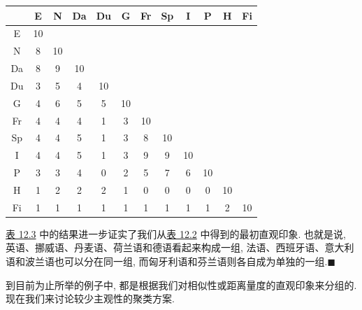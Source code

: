 \begin{mvtable}
\label{tab:12.3}
\footnotesize
\begin{tabular}{cccccccccccc}
\toprule
 & E & N & Da & Du & G & Fr & Sp & I & P & H & Fi\\
\midrule
E & 10 & & & & & & & & & &\\
N & 8 & 10 & & & & & & & & &\\
Da & 8 & 9 & 10 & & & & & & & &\\
Du & 3 & 5 & 4 & 10 & & & & & & &\\
G & 4 & 6 & 5 & 5 & 10 & & & & & &\\
Fr & 4 & 4 & 4 & 1 & 3 & 10 & & & & &\\
Sp & 4 & 4 & 5 & 1 & 3 & 8 & 10 & & & &\\
I & 4 & 4 & 5 & 1 & 3 & 9 & 9 & 10 & & &\\
P & 3 & 3 & 4 & 0 & 2 & 5 & 7 & 6 & 10 & &\\
H & 1 & 2 & 2 & 2 & 1 & 0 & 0 & 0 & 0 & 10 &\\
Fi & 1 & 1 & 1 & 1 & 1 & 1 & 1 & 1 & 1 & 2 & 10\\
\bottomrule
\end{tabular}
\end{mvtable}

\hyperref[tab:12.3]{表 12.3} 中的结果进一步证实了我们从\hyperref[tab:12.2]{表 12.2} 中得到的最初直观印象. 也就是说, 英语、挪威语、丹麦语、荷兰语和德语看起来构成一组, 法语、西班牙语、意大利语和波兰语也可以分在同一组, 而匈牙利语和芬兰语则各自成为单独的一组.\hfill$\blacksquare$

到目前为止所举的例子中, 都是根据我们对相似性或距离量度的直观印象来分组的. 现在我们来讨论较少主观性的聚类方案.
